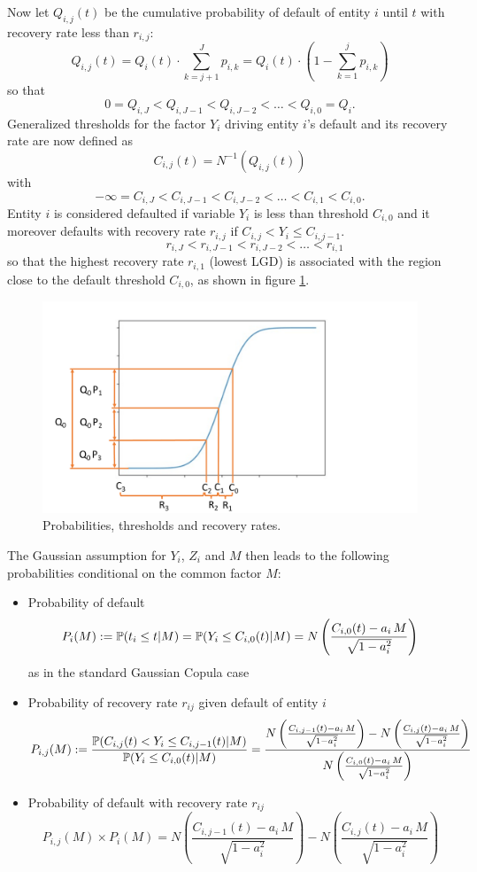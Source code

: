 Now let $Q_{i,j}(t)$ be the cumulative probability of default of entity $i$
until $t$ with recovery rate less than $r_{i,j}$:
$$
Q_{i,j}(t) = Q_i(t) \cdot \sum_{k=j+1}^J p_{i,k}= Q_i(t) \cdot \left(1 - \sum_{k=1}^j p_{i,k}\right)
$$
so that
$$
0 = Q_{i,J} < Q_{i,J-1} < Q_{i,J-2} < \dots < Q_{i,0} = Q_i.
$$
Generalized thresholds for the factor $Y_i$ driving entity $i$'s default and its
recovery rate are now defined as
$$
C_{i,j}(t) = N^{-1}(Q_{i,j}(t))
$$
with
$$
-\infty = C_{i,J} < C_{i,J-1} < C_{i,J-2} < \dots < C_{i,1} < C_{i,0}.
$$
Entity $i$ is considered defaulted if variable $Y_i$ is less than threshold $C_{i,0}$
and it moreover defaults with recovery rate $r_{i,j}$ if $C_{i,j} < Y_i \leq C_{i,j-1}$.
$$
\qquad\qquad r_{i,J} < r_{i,J-1} < r_{i,J-2} < \dots < r_{i,1} 
$$
so that the highest recovery rate $r_{i,1}$ (lowest LGD) is associated with the region close to the default threshold $C_{i,0}$, as shown in figure \ref{fig_copula}.
\begin{figure}[htb]
\begin{center}
\includegraphics[scale=0.4]{pricing/cr_cdo_copula.pdf}
\end{center}
\caption{Probabilities, thresholds and recovery rates. }
\label{fig_copula}
\end{figure}

The Gaussian assumption for $Y_i$, $Z_i$ and $M$ then leads to the following probabilities
conditional on the common factor $M$:
\begin{itemize}
\item Probability of default
$$
P_i(M) := \P(t_i \leq t|M) = \P(Y_i \leq C_{i,0}(t)|M) = N \left( \frac{C_{i,0}(t) - a_i\,M}{\sqrt{1-a_i^2}}\right) 
$$
as in the standard Gaussian Copula case
\item Probability of recovery rate $r_{ij}$ given default of entity $i$
$$
  P_{i,j}(M) := \frac{\P(C_{i,j}(t) < Y_i \leq C_{i, j-1}(t) | M)}{\P(Y_i \leq C_{i,0}(t)|M)} 
  = \frac{ N \left( \frac{C_{i,j-1}(t) - a_i\,M}{\sqrt{1-a_i^2}}\right) - N \left( \frac{C_{i,j}(t) - a_i\,M}{\sqrt{1-a_i^2}}\right) }{ N \left( \frac{C_{i,0}(t) - a_i\,M}{\sqrt{1-a_i^2}}\right) }
  $$
\item Probability of default with recovery rate $r_{ij}$ 
  $$
  P_{i,j}(M)\times P_i(M) =  N \left( \frac{C_{i,j-1}(t) - a_i\,M}{\sqrt{1-a_i^2}}\right) - N \left( \frac{C_{i,j}(t) - a_i\,M}{\sqrt{1-a_i^2}}\right)
$$
\end{itemize}

